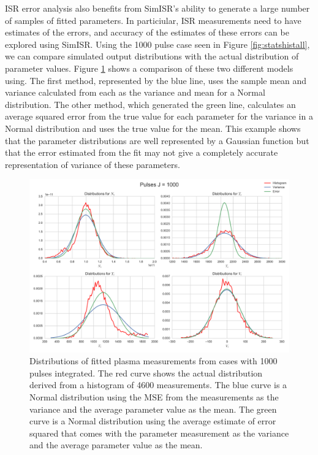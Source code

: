 \documentclass[draft,ras]{agutex}
\begin{document}
\begin{article}
ISR error analysis also benefits from SimISR's ability to generate a large number of samples of fitted parameters. In particiular, ISR measurements need to have estimates of the errors, and accuracy of the estimates of these errors can be explored using SimISR. Using the 1000 pulse case seen in Figure \ref{fig:statshistall}, we can compare simulated output distributions with the actual distribution of parameter values. Figure \ref{fig:statshistsingle} shows a comparison of these two different models using. The first method, represented by the blue line, uses the sample mean and variance calculated from each as the variance and mean for a Normal distribution. The other method, which generated the green line, calculates an average squared error from the true value for each parameter for the variance in a Normal distribution and uses the true value for the mean. 
This example shows that the parameter distributions are well represented by a Gaussian function but that the error estimated from the fit may not give a completely accurate representation of variance of these parameters. 

\begin{figure}[!t]
\centering
\includegraphics[width=5in]{histsingle}
\caption{Distributions of fitted plasma measurements from cases with 1000 pulses integrated. The red curve shows the actual distribution derived from a histogram of 4600 measurements. The blue curve is a Normal distribution using the MSE from the measurements as the variance and the average parameter value as the mean.  The green curve is a Normal distribution using the average estimate of error squared that comes with the parameter measurement as the variance and the average parameter value as the mean.}
\label{fig:statshistsingle}
\end{figure}



\end{article}
\end{document}
